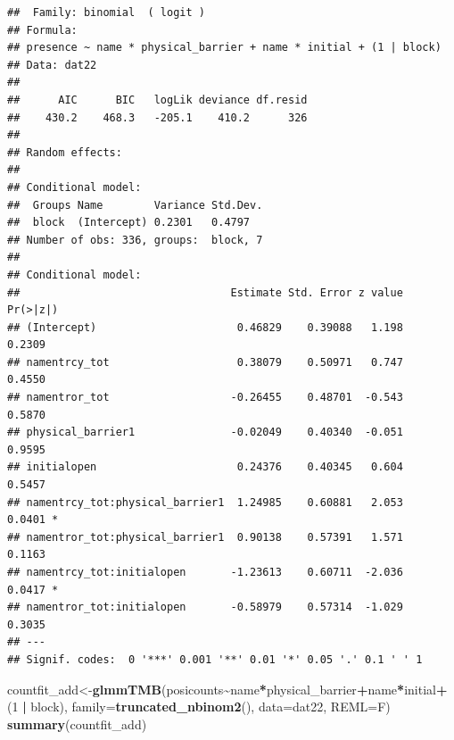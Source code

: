 \documentclass[
]{article}
\newenvironment{Shaded}{\begin{snugshade}}{\end{snugshade}}
\newcommand{\AttributeTok}[1]{\textcolor[rgb]{0.13,0.29,0.53}{#1}}
\newcommand{\DecValTok}[1]{\textcolor[rgb]{0.00,0.00,0.81}{#1}}
\newcommand{\FunctionTok}[1]{\textcolor[rgb]{0.13,0.29,0.53}{\textbf{#1}}}
\newcommand{\NormalTok}[1]{#1}
\newcommand{\OtherTok}[1]{\textcolor[rgb]{0.56,0.35,0.01}{#1}}
\newcommand{\SpecialCharTok}[1]{\textcolor[rgb]{0.81,0.36,0.00}{\textbf{#1}}}
\begin{document}
\begin{verbatim}
##  Family: binomial  ( logit )
## Formula:          
## presence ~ name * physical_barrier + name * initial + (1 | block)
## Data: dat22
## 
##      AIC      BIC   logLik deviance df.resid 
##    430.2    468.3   -205.1    410.2      326 
## 
## Random effects:
## 
## Conditional model:
##  Groups Name        Variance Std.Dev.
##  block  (Intercept) 0.2301   0.4797  
## Number of obs: 336, groups:  block, 7
## 
## Conditional model:
##                                 Estimate Std. Error z value Pr(>|z|)  
## (Intercept)                      0.46829    0.39088   1.198   0.2309  
## namentrcy_tot                    0.38079    0.50971   0.747   0.4550  
## namentror_tot                   -0.26455    0.48701  -0.543   0.5870  
## physical_barrier1               -0.02049    0.40340  -0.051   0.9595  
## initialopen                      0.24376    0.40345   0.604   0.5457  
## namentrcy_tot:physical_barrier1  1.24985    0.60881   2.053   0.0401 *
## namentror_tot:physical_barrier1  0.90138    0.57391   1.571   0.1163  
## namentrcy_tot:initialopen       -1.23613    0.60711  -2.036   0.0417 *
## namentror_tot:initialopen       -0.58979    0.57314  -1.029   0.3035  
## ---
## Signif. codes:  0 '***' 0.001 '**' 0.01 '*' 0.05 '.' 0.1 ' ' 1
\end{verbatim}

\begin{Shaded}
\begin{Highlighting}[]
\NormalTok{countfit\_add}\OtherTok{\textless{}{-}}\FunctionTok{glmmTMB}\NormalTok{(posicounts}\SpecialCharTok{\textasciitilde{}}\NormalTok{name}\SpecialCharTok{*}\NormalTok{physical\_barrier}\SpecialCharTok{+}\NormalTok{name}\SpecialCharTok{*}\NormalTok{initial}\SpecialCharTok{+}\NormalTok{(}\DecValTok{1} \SpecialCharTok{|}\NormalTok{ block), }\AttributeTok{family=}\FunctionTok{truncated\_nbinom2}\NormalTok{(), }\AttributeTok{data=}\NormalTok{dat22, }\AttributeTok{REML=}\NormalTok{F)}
\FunctionTok{summary}\NormalTok{(countfit\_add)}
\end{Highlighting}
\end{Shaded}
\end{document}
